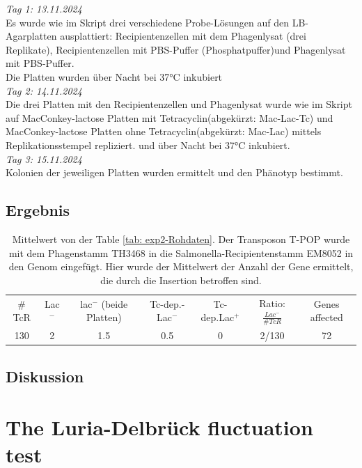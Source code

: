 \documentclass[oneside,10pt,a4paper]{report}
\begin{document}
		\textit{Tag 1: 13.11.2024}\\
		Es wurde wie im Skript \cite{Mibi-Script} drei verschiedene Probe-Lösungen auf den LB-Agarplatten ausplattiert: Recipientenzellen mit dem Phagenlysat (drei Replikate), Recipientenzellen mit PBS-Puffer (Phosphatpuffer)und Phagenlysat mit PBS-Puffer.\\
		Die Platten wurden über Nacht bei 37°C inkubiert
		\\
		\textit{Tag 2: 14.11.2024}\\
		Die drei Platten mit den Recipientenzellen und Phagenlysat wurde wie im Skript \cite{Mibi-Script} auf MacConkey-lactose Platten mit Tetracyclin(abgekürzt: Mac-Lac-Tc) und MacConkey-lactose Platten ohne Tetracyclin(abgekürzt: Mac-Lac) mittels Replikationsstempel repliziert. und über Nacht bei 37°C inkubiert.\\
		\textit{Tag 3: 15.11.2024}\\
		Kolonien der jeweiligen Platten wurden ermittelt und den Phänotyp bestimmt.
		\section{Ergebnis}
			\begin{table}[H]
			\centering
			\caption{Mittelwert von der Table \ref{tab: exp2-Rohdaten}. Der Transposon T-POP wurde mit dem Phagenstamm TH3468 in die Salmonella-Recipientenstamm EM8052 in den Genom eingefügt. Hier wurde der Mittelwert der Anzahl der Gene ermittelt, die durch die Insertion betroffen sind.}
			\label{tab: exp2-ergebnis}
			\begin{tabular}{ccccccc}
				\toprule
			\multirow{2}{*}{$\#$TcR} & \multirow{2}{*}{Lac$^-$}&\multirow{2}{*}{lac$^-$ (beide Platten)} & \multirow{2}{*}{Tc-dep.-Lac$^-$}& \multirow{2}{*}{Tc-dep.Lac$^+$}& \multirow{2}{*}{Ratio: $\frac{Lac^-}{\#TcR}$}&\multirow{2}{*}{\parbox[*]{1.2cm}{Genes affected}}\\
				&&&&&&\\
				\midrule
				130 & 2 & 1.5 & 0.5 & 0 & 2/130 & 72\\
				\bottomrule			
			\end{tabular}
		\end{table}
		\section{Diskussion}

	
	\chapter{The Luria-Delbrück fluctuation test}	
\end{document}
